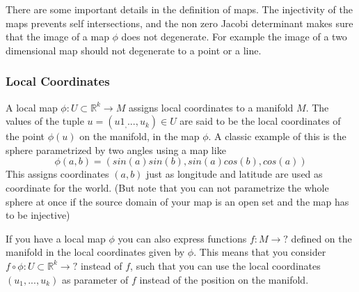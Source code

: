 There are some important details in the definition of maps. The injectivity of the maps prevents self intersections, and the non zero Jacobi determinant makes sure that the image of a map $\phi$ does not degenerate. For example the image of a two dimensional map should not degenerate to a point or a line.

\subsubsection{Local Coordinates}

A local map $\phi: U \subset \mathbb R^k \rightarrow M$ assigns local coordinates to a manifold $M$. The values of the tuple $u=(u1_,...,u_k)\in U$ are said to be the local coordinates of the point $\phi(u)$ on the manifold, in the map $\phi$. A classic example of this is the sphere parametrized by two angles using a map like
\[\phi(a,b) = (sin(a)sin(b), sin(a)cos(b), cos(a))\]
This assigns coordinates $(a,b)$ just as longitude and latitude are used as coordinate for the world. (But note that you can not parametrize the whole sphere at once if the source domain of your map is an open set and the map has to be injective)

If you have a local map $\phi$ you can also express functions $f:M \rightarrow ?$ defined on the manifold in the local coordinates given by $\phi$. This means that you consider $f \circ \phi : U \subset \mathbb R^k \rightarrow ?$ instead of $f$, such that you can use the local coordinates $(u_1,...,u_k)$ as parameter of $f$ instead of the position on the manifold. %

%
%
%
%

